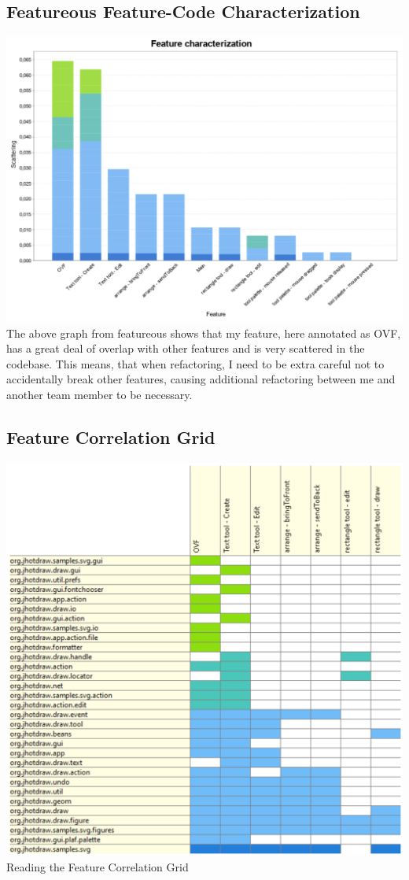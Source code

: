 \subsection{Featureous Feature-Code Characterization}
\includegraphics[width=\textwidth]{Images/featurecharacterization.png}
The above graph from featureous shows that my feature, here annotated as OVF, has a great deal of overlap with other features and is very scattered in the codebase. This means, that when refactoring, I need to be extra careful not to accidentally break other features, causing additional refactoring between me and another team member to be necessary.

\subsection{Feature Correlation Grid}
\includegraphics[width=\textwidth]{Images/featureousgrid.png}
Reading the Feature Correlation Grid
